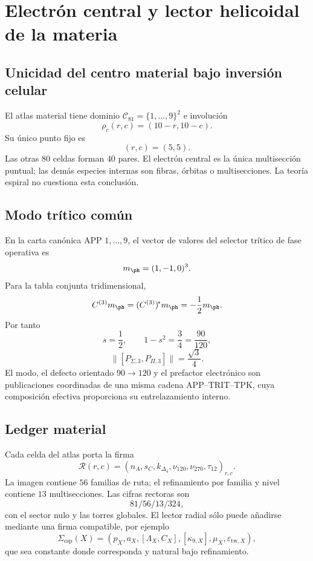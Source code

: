 \chapter{Electrón central y lector helicoidal de la materia}

\section{Unicidad del centro material bajo inversión celular}

El atlas material tiene dominio \(\mathcal C_{81}=\{1,\ldots,9\}^2\) e
involución
\[
 \rho_c(r,c)=(10-r,10-c).
\]
Su único punto fijo es
\[
 (r,c)=(5,5).
\]
Las otras \(80\) celdas forman \(40\) pares. El electrón central es la
única multisección puntual; las demás especies internas son fibras, órbitas
o multisecciones. La teoría espiral no cuestiona esta conclusión.

\section{Modo trítico común}

En la carta canónica APP \(1,\ldots,9\), el vector de valores del selector
trítico de fase operativa es
\[
 m_{\ph}=(1,-1,0)^3.
\]
Para la tabla conjunta tridimensional,
\[
 C^{(3)}m_{\ph}=(C^{(3)})^{\!*}m_{\ph}
 =-\frac12m_{\ph}.
\]
Por tanto
\[
 s=\frac12,\qquad
 1-s^2=\frac34=\frac{90}{120},
\]
\begin{equation}
 \|[P_{\Sigma,3},P_{\Pi,3}]\|
 =\frac{\sqrt3}{4}.
 \label{espiral:eq:modo-electron-app}
\end{equation}
El modo, el defecto orientado \(90\to120\) y el prefactor electrónico son
publicaciones coordinadas de una misma cadena APP--TRIT--TPK, cuya composición
efectiva proporciona su entrelazamiento interno.

\section{Ledger material}

Cada celda del atlas porta la firma
\[
 \mathcal R(r,c)=
 (n_A,s_C,k_{\Delta_4},\nu_{120},\nu_{270},\tau_{12})_{r,c}.
\]
La imagen contiene \(56\) familias de ruta; el refinamiento por familia y
nivel contiene \(13\) multisecciones. Las cifras rectoras son
\[
 81/56/13/324,
\]
con el sector nulo y las torres globales. El lector radial sólo puede añadirse
mediante una firma compatible, por ejemplo
\[
 \Sigma_{\mathrm{esp}}(X)=
 (p_X,a_X,[\Lambda_X,C_X],
 [\kappa_{9,X}],\mu_X,\varepsilon_{{\mathrm{tw}},X}),
\]
que sea constante donde corresponda y natural bajo refinamiento.

